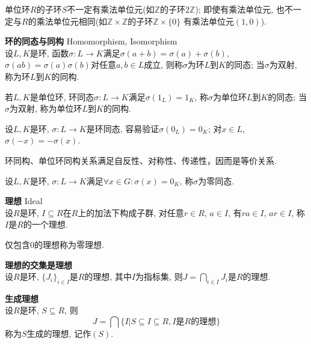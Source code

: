 \par 单位环$R$的子环$S$不一定有乘法单位元(如$\mathbb{Z}$的子环$2\mathbb{Z}$); 即使有乘法单位元, 也不一定与$R$的乘法单位元相同(如$\mathbb{Z}\times \mathbb{Z}$的子环$\mathbb{Z}\times \{0\}$ 有乘法单位元$(1,0)$).


\begin{dfn} \textbf{环的同态与同构} Homomorphism, Isomorphism\\
设$L,K$是环, 函数$\sigma:L\to K$满足$\sigma(a+b)=\sigma(a)+\sigma(b)$, $\sigma(ab)=\sigma(a)\sigma(b)$对任意$a,b\in L$成立, 则称$\sigma$为环$L$到$K$的同态; 当$\sigma$为双射, 称为环$L$到$K$的同构.

若$L,K$是单位环, 环同态$\sigma: L\to K$满足$\sigma(1_L)=1_K$, 称$\sigma$为单位环$L$到$K$的同态; 当$\sigma$为双射, 称为单位环$L$到$K$的同构.
\end{dfn}
设$L,K$是环, $\sigma:L\to K$是环同态, 容易验证$\sigma(0_L)=0_K$; 对$x\in L$, $\sigma(-x)=-\sigma(x)$.

环同构、单位环同构关系满足自反性、对称性、传递性，因而是等价关系. 

设$L,K$是环, $\sigma:L\to K$满足$\forall x\in G: \sigma(x)=0_K$, 称$\sigma$为零同态. 

\begin{dfn} \textbf{理想} Ideal\\
设$R$是环, $I\subseteq R$在$R$上的加法下构成子群, 对任意$r\in R$, $a\in I$, 有$ra \in I$, $ar \in I$, 称$I$是$R$的一个理想.   
\end{dfn}
仅包含0的理想称为零理想. 

\begin{pro} \textbf{理想的交集是理想}\\
设$R$是环, $\{J_i\}_{i\in I}$是$R$的理想, 其中$I$为指标集, 则$J=\bigcap_{i\in I} J_i$是$R$的理想.  
\end{pro}

\begin{pro} \textbf{生成理想}\\
设$R$是环, $S \subseteq R$, 则
\begin{displaymath}
    J=\bigcap \{I\vert S\subseteq I \subseteq R, I\text{是}R\text{的理想}\}
\end{displaymath}
称为$S$生成的理想, 记作$(S)$. 
\end{pro}

